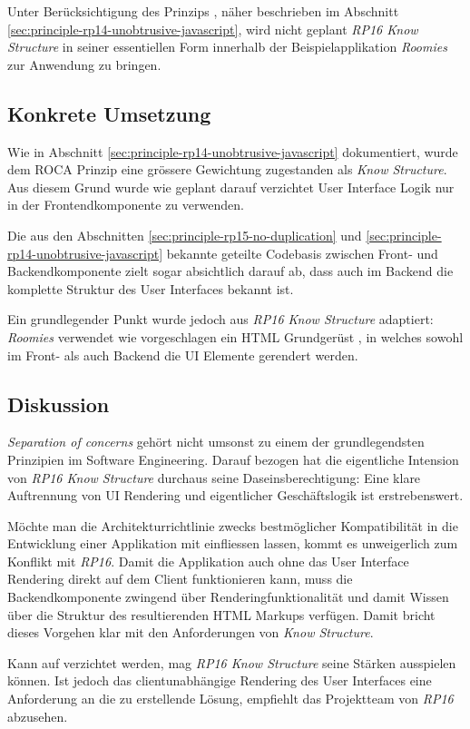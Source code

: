 Unter Berücksichtigung des Prinzips \emph{}, näher beschrieben im Abschnitt \ref{sec:principle-rp14-unobtrusive-javascript}, wird nicht geplant \emph{RP16 Know Structure} in seiner essentiellen Form innerhalb der Beispielapplikation \emph{Roomies} zur Anwendung zu bringen.


\subsection*{Konkrete Umsetzung}

Wie in Abschnitt \ref{sec:principle-rp14-unobtrusive-javascript} dokumentiert, wurde dem ROCA Prinzip \emph{} eine grössere Gewichtung zugestanden als \emph{Know Structure}. Aus diesem Grund wurde wie geplant darauf verzichtet User Interface Logik nur in der Frontendkomponente zu verwenden.

Die aus den Abschnitten \ref{sec:principle-rp15-no-duplication} und \ref{sec:principle-rp14-unobtrusive-javascript} bekannte geteilte Codebasis zwischen Front- und Backendkomponente zielt sogar absichtlich darauf ab, dass auch im Backend die komplette Struktur des User Interfaces bekannt ist.

Ein grundlegender Punkt wurde jedoch aus \emph{RP16 Know Structure} adaptiert: \emph{Roomies} verwendet wie vorgeschlagen ein HTML Grundgerüst \cite{roomiesHtmlSkeleton}, in welches sowohl im Front- als auch Backend die UI Elemente gerendert werden.


\subsection*{Diskussion}

\emph{Separation of concerns} \cite{SeparationOfConcerns} gehört nicht umsonst zu einem der grundlegendsten Prinzipien im Software Engineering. Darauf bezogen hat die eigentliche Intension von \emph{RP16 Know Structure} durchaus seine Daseinsberechtigung: Eine klare Auftrennung von UI Rendering und eigentlicher Geschäftslogik ist erstrebenswert.

Möchte man die Architekturrichtlinie \emph{} zwecks bestmöglicher Kompatibilität in die Entwicklung einer Applikation mit einfliessen lassen, kommt es unweigerlich zum Konflikt mit \emph{RP16}. Damit die Applikation auch ohne das User Interface Rendering direkt auf dem Client funktionieren kann, muss die Backendkomponente zwingend über Renderingfunktionalität und damit Wissen über die Struktur des resultierenden HTML Markups verfügen. Damit bricht dieses Vorgehen klar mit den Anforderungen von \emph{Know Structure}.

Kann auf \emph{} verzichtet werden, mag \emph{RP16 Know Structure} seine Stärken ausspielen können. Ist jedoch das clientunabhängige Rendering des User Interfaces eine Anforderung an die zu erstellende Lösung, empfiehlt das Projektteam von \emph{RP16} abzusehen.
